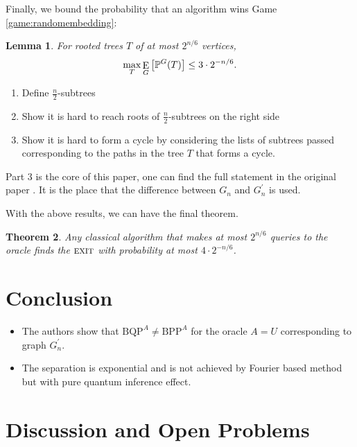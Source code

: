 \documentclass[aps,11pt,twoside,nofootinbib,tightenlines,superscriptaddress,preprintnumbers]{revtex4}
\newcommand{\<}{\langle}
\renewcommand{\>}{\rangle}
\newcommand{\be}{\begin{equation}}
\newcommand{\ee}{\end{equation}}
\newcommand{\BPP}{{\mathrm{BPP}}}
\newcommand{\BQP}{{\mathrm{BQP}}}
\newcommand{\exit}{{\textsc{exit}}}
\newcommand\symExpec{\mathop{\mathrm{E}}\displaylimits}
\def\expec#1#2{\symExpec_{#1}\left[ #2 \right]}
\newtheorem{theorem}{Theorem}
\newtheorem{lemma}[theorem]{Lemma}
\newenvironment{proof sketch}
{\trivlist\item\noindent{\bf Proof sketch}~}
{\qed\endtrivlist}
\begin{document}
\noindent
Finally, we bound the probability that an algorithm wins Game \ref{game:randomembedding}:

\begin{lemma}\label{lem:ourGraphs}
For rooted trees $T$ of at most $2^{n/6}$ vertices,
\be
 \max_{T}
  \expec{G}{\mathbb{P}^G(T)}
  \leq 3 \cdot 2^{-n/6}.
\ee
\end{lemma}

\begin{proof sketch}

\begin{enumerate}
    \item Define $\frac{n}{2}$-subtrees
    \item Show it is hard to reach roots of $\frac{n}{2}$-subtrees on the right side
    \item Show it is hard to form a cycle by considering the lists of subtrees passed corresponding to the paths in the tree $T$ that forms a cycle.
\end{enumerate}

Part 3 is the core of this paper, one can find the full statement in the original paper \cite{EXP03}. It is the place that the difference between $G_n$ and $G^{\prime}_n$ is used.

\end{proof sketch}

With the above results, we can have the final theorem.

\begin{theorem}
Any classical algorithm that makes at most $2^{n/6}$ queries to the oracle
finds the $\exit$ with probability at most $4 \cdot 2^{-n/6}$.
\end{theorem}


\section{Conclusion}\label{sec:conclusion}

\begin{itemize}
    \item The authors show that $\BQP^{A} \neq \BPP^{A}$ for the oracle $A=U$ corresponding to graph $G^{\prime}_n$.
    \item The separation is exponential and is not achieved by Fourier based method but with pure quantum inference effect.
\end{itemize}

\section{Discussion and Open Problems}\label{sec:discussion}
\end{document}
